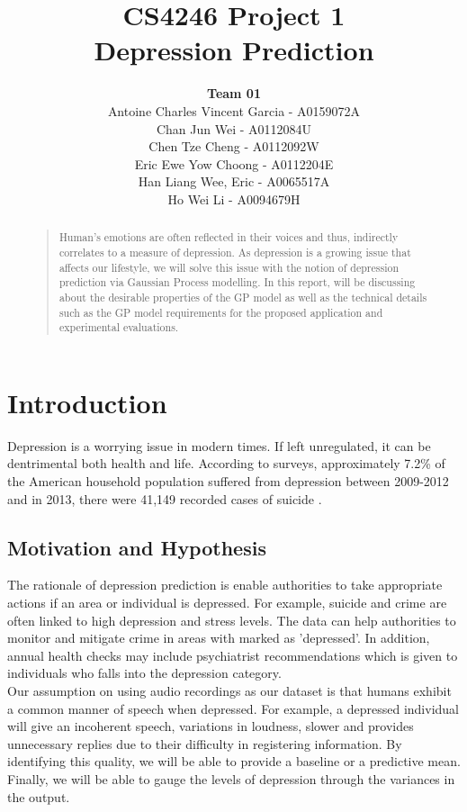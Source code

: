 \documentclass{article}
\title{
	CS4246 Project 1\\ Depression Prediction
}
\author{
	{\bf Team 01} \\
	Antoine Charles Vincent Garcia - A0159072A\\
	Chan Jun Wei - A0112084U\\
	Chen Tze Cheng - A0112092W\\
	Eric Ewe Yow Choong - A0112204E\\
	Han Liang Wee, Eric - A0065517A\\
	Ho Wei Li - A0094679H\\
}
\begin{document}
 	\maketitle

	\begin{abstract}
	\begin{quote}
	Human's emotions are often reflected in their voices and thus, indirectly correlates to a measure of depression. 
	As depression is a growing issue that affects our lifestyle, we will solve this issue with the notion of depression prediction via Gaussian Process modelling.
	In this report, will be discussing about the desirable properties of the GP model as well as the technical details such as the 
	GP model requirements for the proposed application and experimental evaluations. \\
	\end{quote}
	\end{abstract}
	
	\section{Introduction}
	Depression is a worrying issue in modern times. 
	If left unregulated, it can be dentrimental both health and life.
	According to surveys, approximately 7.2\% of the American household population suffered from depression between 2009-2012 \cite{nchs2014} and
	in 2013, there were 41,149 recorded cases of suicide \cite{nvsr2016}. \\

	\subsection{Motivation and Hypothesis}
	The rationale of depression prediction is enable authorities to take appropriate actions if an area or individual is depressed. 
	For example, suicide and crime are often linked to high depression and stress levels. The data can help authorities to monitor and mitigate crime in areas with marked as 'depressed'. 
	In addition, annual health checks may include psychiatrist recommendations which is given to individuals who falls into the depression category. \\
	
	Our assumption on using audio recordings as our dataset is that humans exhibit a common manner of speech when depressed.
	For example, a depressed individual will give an incoherent speech, variations in loudness, slower and
	provides unnecessary replies due to their difficulty in registering information.
	By identifying this quality, we will be able to provide a baseline or a predictive mean.
	Finally, we will be able to gauge the levels of depression through the variances in the output.
	
\end{document}
